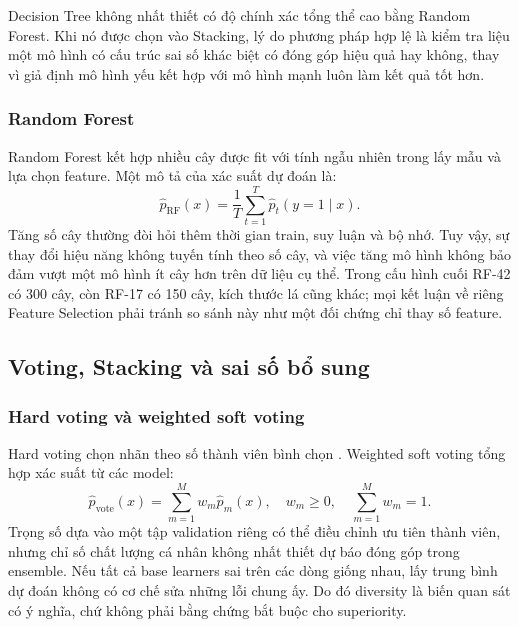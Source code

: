 Decision Tree không nhất thiết có độ chính xác tổng thể cao bằng Random Forest. Khi nó được chọn vào Stacking, lý do phương pháp hợp lệ là kiểm tra liệu một mô hình có cấu trúc sai số khác biệt có đóng góp hiệu quả hay không, thay vì giả định mô hình yếu kết hợp với mô hình mạnh luôn làm kết quả tốt hơn.

\subsubsection{Random Forest}
Random Forest kết hợp nhiều cây được fit với tính ngẫu nhiên trong lấy mẫu và lựa chọn feature. Một mô tả của xác suất dự đoán là:
\begin{equation}
\widehat p_{\mathrm{RF}}(x)=\frac{1}{T}\sum_{t=1}^{T}\widehat p_t(y=1\mid x).
\label{eq:rf}
\end{equation}
Tăng số cây thường đòi hỏi thêm thời gian train, suy luận và bộ nhớ. Tuy vậy, sự thay đổi hiệu năng không tuyến tính theo số cây, và việc tăng mô hình không bảo đảm vượt một mô hình ít cây hơn trên dữ liệu cụ thể. Trong cấu hình cuối RF-42 có 300 cây, còn RF-17 có 150 cây, kích thước lá cũng khác; mọi kết luận về riêng Feature Selection phải tránh so sánh này như một đối chứng chỉ thay số feature.

\subsection{Voting, Stacking và sai số bổ sung}
\subsubsection{Hard voting và weighted soft voting}
Hard voting chọn nhãn theo số thành viên bình chọn \cite{legacyL01,legacyL05}. Weighted soft voting tổng hợp xác suất từ các model:
\begin{equation}
\widehat p_{\mathrm{vote}}(x)=\sum_{m=1}^{M}w_m\widehat p_m(x),\quad
w_m\ge 0,\quad\sum_{m=1}^{M}w_m=1.
\label{eq:voting}
\end{equation}
Trọng số dựa vào một tập validation riêng có thể điều chỉnh ưu tiên thành viên, nhưng chỉ số chất lượng cá nhân không nhất thiết dự báo đóng góp trong ensemble. Nếu tất cả base learners sai trên các dòng giống nhau, lấy trung bình dự đoán không có cơ chế sửa những lỗi chung ấy. Do đó diversity là biến quan sát có ý nghĩa, chứ không phải bằng chứng bắt buộc cho superiority.

